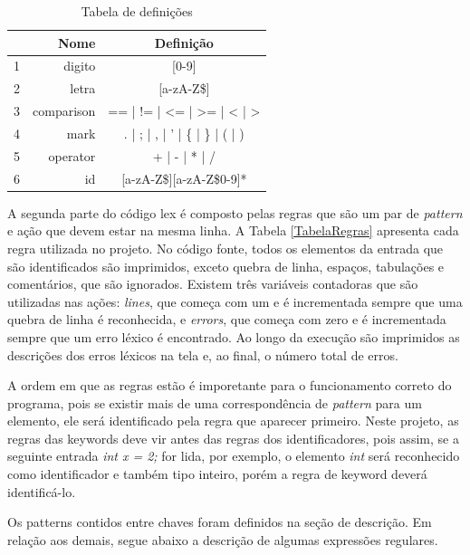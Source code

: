 \documentclass[12pt]{article}
\begin{document}
\begin{table}
 \centering
 \begin{tabular}{| c || r  c |}
  \hline
   & Nome & Definição \\
  \hline  \hline
  1 & digito & [0-9] \\
  \hline
  2 & letra & [a-zA-Z\$] \\
  \hline
  3 & comparison & == | != | <= | >= | < | > \\
  \hline
  4 & mark & . | ; | , | ' | \{ | \} | ( | ) \\
  \hline
  5 & operator & + | - | * | / \\
  \hline
  6 & id & [a-zA-Z\$][a-zA-Z\$0-9]* \\
  \hline
\end{tabular}
\caption{Tabela de definições}
\label{TabelaDef}
\end{table}
 
\indent A segunda parte do código lex é composto pelas regras que são um par de \textit{pattern} e ação que devem estar na mesma linha. A Tabela \ref{TabelaRegras} apresenta cada regra utilizada no projeto. No código fonte, todos os elementos da entrada que são identificados são imprimidos, exceto quebra de linha, espaços, tabulações e comentários, que são ignorados. Existem três variáveis contadoras que são utilizadas nas ações: \textit{lines}, que começa com um e é incrementada sempre que uma quebra de linha é reconhecida, e \textit{errors}, que começa com zero e é incrementada sempre que um erro léxico é encontrado. Ao longo da execução são imprimidos as descrições dos erros léxicos na tela e, ao final, o número total de erros.

\indent A ordem em que as regras estão é imporetante para o funcionamento correto do programa, pois se existir mais de uma correspondência de \textit{pattern} para um elemento, ele será identificado pela regra que aparecer primeiro. Neste projeto, as regras das keywords deve vir antes das regras dos identificadores, pois assim, se a seguinte entrada \textit{int x = 2;} for lida, por exemplo, o elemento \textit{int} será reconhecido como identificador e também tipo inteiro, porém a regra de keyword deverá identificá-lo.

\indent Os patterns contidos entre chaves foram definidos na seção de descrição. Em relação aos demais, segue abaixo a descrição de algumas expressões regulares. 
\end{document}
